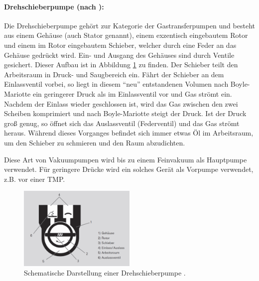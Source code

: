 \paragraph{Drehschieberpumpe (nach \cite{pfeiffer}):}
Die Drehschieberpumpe gehört zur Kategorie der Gastransferpumpen und besteht aus einem Gehäuse (auch Stator genannt),
einem exzentisch eingebautem Rotor und einem im Rotor eingebautem Schieber,
welcher durch eine Feder an das Gehäuse gedrückt wird.
Ein- und Ausgang des Gehäuses sind durch Ventile gesichert.
Dieser Aufbau ist in Abbildung \ref{fig:DSP} zu finden.
Der Schieber teilt den Arbeitsraum in Druck- und Saugbereich ein.
Fährt der Schieber an dem Einlassventil vorbei,
so liegt in diesem \enquote{neu} entstandenen Volumen nach Boyle-Mariotte
ein geringerer Druck als im Einlassventil vor und Gas strömt ein.
Nachdem der Einlass wieder geschlossen ist,
wird das Gas zwischen den zwei Scheiben komprimiert und nach
Boyle-Mariotte steigt der Druck.
Ist der Druck groß genug, so öffnet sich das Auslassventil (Federventil) und das Gas strömt heraus.
Während dieses Vorganges befindet sich immer etwas Öl im Arbeitsraum,
um den Schieber zu schmieren und den Raum abzudichten.

Diese Art von Vakuumpumpen wird bis zu einem Feinvakuum als Hauptpumpe verwendet.
Für geringere Drücke wird ein solches Gerät als Vorpumpe verwendet,
z.B. vor einer TMP.

\begin{figure}
 \centering
 \includegraphics[width=0.5\textwidth]{Drehschieberpumpe.png}
 \caption{Schematische Darstellung einer Drehschieberpumpe \cite{DSP}.}
 \label{fig:DSP}
\end{figure}

